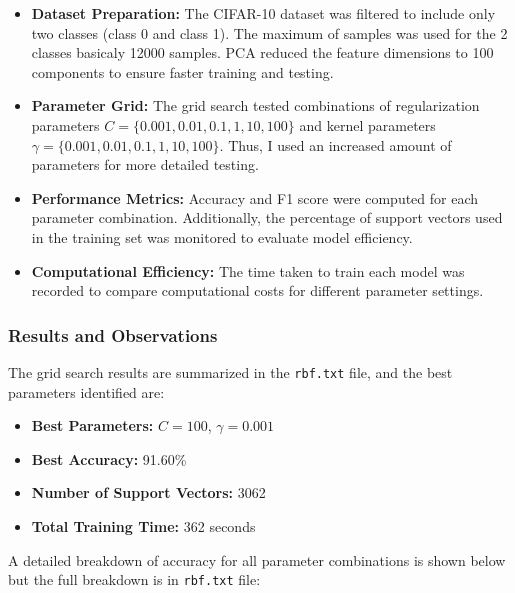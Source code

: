 \documentclass[lettersize,journal]{IEEEtran}
\begin{document}
\begin{itemize}
    \item \textbf{Dataset Preparation:} 
    The CIFAR-10 dataset was filtered to include only two classes (class 0 and class 1). The maximum of samples was used for the 2 classes basicaly 12000 samples. PCA reduced the feature dimensions to 100 components to ensure faster training and testing.
    
    \item \textbf{Parameter Grid:} 
    The grid search tested combinations of regularization parameters $C = \{0.001, 0.01, 0.1, 1, 10, 100\}$ and kernel parameters $\gamma = \{0.001, 0.01, 0.1, 1, 10, 100\}$. Thus, I used an increased amount of parameters for more detailed testing.

    \item \textbf{Performance Metrics:} 
    Accuracy and F1 score were computed for each parameter combination. Additionally, the percentage of support vectors used in the training set was monitored to evaluate model efficiency.

    \item \textbf{Computational Efficiency:} 
    The time taken to train each model was recorded to compare computational costs for different parameter settings.
\end{itemize}

\vspace{0.5cm}

\subsubsection{\textbf{Results and Observations}}
The grid search results are summarized in the \texttt{rbf.txt} file, and the best parameters identified are:

\begin{itemize}
    \item \textbf{Best Parameters:} $C = 100$, $\gamma = 0.001$
    \item \textbf{Best Accuracy:} 91.60\%
    \item \textbf{Number of Support Vectors:} 3062
    \item \textbf{Total Training Time:} 362 seconds
\end{itemize}

A detailed breakdown of accuracy for all parameter combinations is shown below but the full breakdown is in \texttt{rbf.txt} file:
\end{document}
